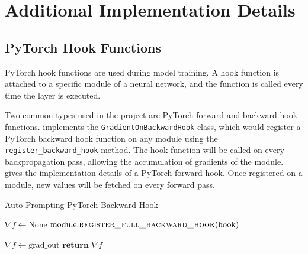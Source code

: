 \chapter{Additional Implementation Details}
\section{PyTorch Hook Functions}
PyTorch hook functions are used during model training. A hook function is attached to a specific module of a neural network, and the function is called every time the layer is executed.

Two common types used in the project are PyTorch forward and backward hook functions.  implements the \texttt{GradientOnBackwardHook} class, which would register a PyTorch backward hook function on any module using the \texttt{register\_backward\_hook} method. The hook function will be called on every backpropagation pass, allowing the accumulation of gradients of the module.  gives the implementation details of a PyTorch forward hook. Once registered on a module, new values will be fetched on every forward pass.

\begin{algorithm}
\caption{Auto Prompting PyTorch Backward Hook} \label{alg:appendix-auto-hook}
\begin{algorithmic}[1]
\small
{}
\State $\nabla f \gets \text{None}$
{\color{mylightgrey}}
\State $\text{module}.\Call{\text{register\_full\_backward\_hook}}{\text{hook}}$ {\color{mylightgrey}}
\EndProcedure

  \State $\nabla f \gets \text{grad\_out}$ {\color{mylightgrey}}
\EndProcedure
{}
  \State $\textbf{return } \nabla f$ {\color{mylightgrey}}
\EndProcedure
\EndClass
\end{algorithmic}
\end{algorithm}

